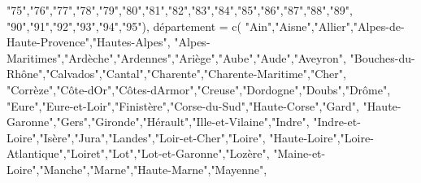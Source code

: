 \documentclass[
  letterpaper,
  DIV=11,
  numbers=noendperiod]{scrartcl}
\newenvironment{Shaded}{\begin{snugshade}}{\end{snugshade}}
\newcommand{\FunctionTok}[1]{\textcolor[rgb]{0.28,0.35,0.67}{#1}}
\newcommand{\NormalTok}[1]{\textcolor[rgb]{0.00,0.23,0.31}{#1}}
\newcommand{\OtherTok}[1]{\textcolor[rgb]{0.00,0.23,0.31}{#1}}
\newcommand{\StringTok}[1]{\textcolor[rgb]{0.13,0.47,0.30}{#1}}
\begin{document}
\begin{Shaded}
\begin{Highlighting}[]
    \StringTok{"75"}\NormalTok{,}\StringTok{"76"}\NormalTok{,}\StringTok{"77"}\NormalTok{,}\StringTok{"78"}\NormalTok{,}\StringTok{"79"}\NormalTok{,}\StringTok{"80"}\NormalTok{,}\StringTok{"81"}\NormalTok{,}\StringTok{"82"}\NormalTok{,}\StringTok{"83"}\NormalTok{,}\StringTok{"84"}\NormalTok{,}\StringTok{"85"}\NormalTok{,}\StringTok{"86"}\NormalTok{,}\StringTok{"87"}\NormalTok{,}\StringTok{"88"}\NormalTok{,}\StringTok{"89"}\NormalTok{,}
    \StringTok{"90"}\NormalTok{,}\StringTok{"91"}\NormalTok{,}\StringTok{"92"}\NormalTok{,}\StringTok{"93"}\NormalTok{,}\StringTok{"94"}\NormalTok{,}\StringTok{"95"}\NormalTok{),}
\NormalTok{  département }\OtherTok{=} \FunctionTok{c}\NormalTok{(}
    \StringTok{"Ain"}\NormalTok{,}\StringTok{"Aisne"}\NormalTok{,}\StringTok{"Allier"}\NormalTok{,}\StringTok{"Alpes{-}de{-}Haute{-}Provence"}\NormalTok{,}\StringTok{"Hautes{-}Alpes"}\NormalTok{,}
    \StringTok{"Alpes{-}Maritimes"}\NormalTok{,}\StringTok{"Ardèche"}\NormalTok{,}\StringTok{"Ardennes"}\NormalTok{,}\StringTok{"Ariège"}\NormalTok{,}\StringTok{"Aube"}\NormalTok{,}\StringTok{"Aude"}\NormalTok{,}\StringTok{"Aveyron"}\NormalTok{,}
    \StringTok{"Bouches{-}du{-}Rhône"}\NormalTok{,}\StringTok{"Calvados"}\NormalTok{,}\StringTok{"Cantal"}\NormalTok{,}\StringTok{"Charente"}\NormalTok{,}\StringTok{"Charente{-}Maritime"}\NormalTok{,}\StringTok{"Cher"}\NormalTok{,}
    \StringTok{"Corrèze"}\NormalTok{,}\StringTok{"Côte{-}d\textquotesingle{}Or"}\NormalTok{,}\StringTok{"Côtes{-}d\textquotesingle{}Armor"}\NormalTok{,}\StringTok{"Creuse"}\NormalTok{,}\StringTok{"Dordogne"}\NormalTok{,}\StringTok{"Doubs"}\NormalTok{,}\StringTok{"Drôme"}\NormalTok{,}
    \StringTok{"Eure"}\NormalTok{,}\StringTok{"Eure{-}et{-}Loir"}\NormalTok{,}\StringTok{"Finistère"}\NormalTok{,}\StringTok{"Corse{-}du{-}Sud"}\NormalTok{,}\StringTok{"Haute{-}Corse"}\NormalTok{,}\StringTok{"Gard"}\NormalTok{,}
    \StringTok{"Haute{-}Garonne"}\NormalTok{,}\StringTok{"Gers"}\NormalTok{,}\StringTok{"Gironde"}\NormalTok{,}\StringTok{"Hérault"}\NormalTok{,}\StringTok{"Ille{-}et{-}Vilaine"}\NormalTok{,}\StringTok{"Indre"}\NormalTok{,}
    \StringTok{"Indre{-}et{-}Loire"}\NormalTok{,}\StringTok{"Isère"}\NormalTok{,}\StringTok{"Jura"}\NormalTok{,}\StringTok{"Landes"}\NormalTok{,}\StringTok{"Loir{-}et{-}Cher"}\NormalTok{,}\StringTok{"Loire"}\NormalTok{,}
    \StringTok{"Haute{-}Loire"}\NormalTok{,}\StringTok{"Loire{-}Atlantique"}\NormalTok{,}\StringTok{"Loiret"}\NormalTok{,}\StringTok{"Lot"}\NormalTok{,}\StringTok{"Lot{-}et{-}Garonne"}\NormalTok{,}\StringTok{"Lozère"}\NormalTok{,}
    \StringTok{"Maine{-}et{-}Loire"}\NormalTok{,}\StringTok{"Manche"}\NormalTok{,}\StringTok{"Marne"}\NormalTok{,}\StringTok{"Haute{-}Marne"}\NormalTok{,}\StringTok{"Mayenne"}\NormalTok{,}

\end{Highlighting}
\end{Shaded}
\end{document}
